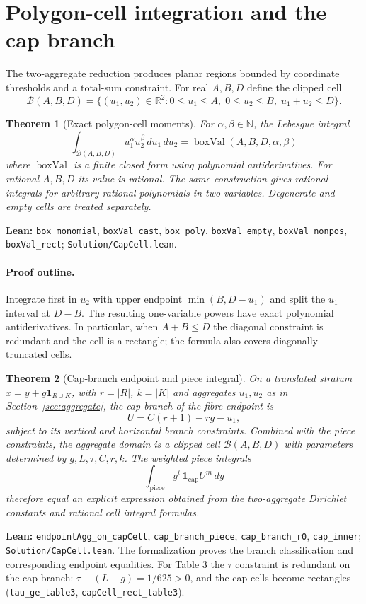 \documentclass[11pt]{article}
\newtheorem{theorem}{Theorem}[section]
\newcommand{\R}{\mathbb{R}}
\newcommand{\N}{\mathbb{N}}
\newcommand{\code}[1]{\texttt{#1}}
\begin{document}
\section{Polygon-cell integration and the cap branch}\label{sec:capcell}
The two-aggregate reduction produces planar regions bounded by coordinate
thresholds and a total-sum constraint. For real $A,B,D$ define the clipped cell
\[
 \mathcal B(A,B,D)=\{(u_1,u_2)\in\R^2:0\le u_1\le A,\;
 0\le u_2\le B,\;u_1+u_2\le D\}.
\]
\begin{theorem}[Exact polygon-cell moments]\label{thm:box}
For $\alpha,\beta\in\N$, the Lebesgue integral
\[
 \int_{\mathcal B(A,B,D)}u_1^\alpha u_2^\beta\,du_1\,du_2
 =\operatorname{boxVal}(A,B,D,\alpha,\beta)
\]
where $\operatorname{boxVal}$ is a finite closed form using polynomial
antiderivatives. For rational $A,B,D$ its value is rational. The same
construction gives rational integrals for arbitrary rational polynomials in
two variables. Degenerate and empty cells are treated separately.
\end{theorem}
\noindent\textbf{Lean:} \code{box\_monomial}, \code{boxVal\_cast},
\code{box\_poly}, \code{boxVal\_empty}, \code{boxVal\_nonpos},
\code{boxVal\_rect}; \nolinkurl{Solution/CapCell.lean}.

\paragraph{Proof outline.}
Integrate first in $u_2$ with upper endpoint
$\min(B,D-u_1)$ and split the $u_1$ interval at $D-B$. The resulting
one-variable powers have exact polynomial antiderivatives. In particular,
when $A+B\le D$ the diagonal constraint is redundant and the cell is a
rectangle; the formula also covers diagonally truncated cells.

\begin{theorem}[Cap-branch endpoint and piece integral]\label{thm:capbranch}
On a translated stratum $x=y+g\mathbf1_{R\cup K}$, with
$r=|R|$, $k=|K|$ and aggregates $u_1,u_2$ as in
Section~\ref{sec:aggregate}, the cap branch of the fibre endpoint is
\[
 U=C(r+1)-rg-u_1,
\]
subject to its vertical and horizontal branch constraints. Combined with
the piece constraints, the aggregate domain is a clipped cell
$\mathcal B(A,B,D)$ with parameters determined by $g,L,\tau,C,r,k$.
The weighted piece integrals
\[
 \int_{\mathrm{piece}} y^t\,\mathbf1_{\mathrm{cap}}
 U^m\,dy
\]
therefore equal an explicit expression obtained from the two-aggregate
Dirichlet constants and rational cell integral formulas.
\end{theorem}
\noindent\textbf{Lean:} \code{endpointAgg\_on\_capCell},
\code{cap\_branch\_piece}, \code{cap\_branch\_r0},
\code{cap\_inner}; \nolinkurl{Solution/CapCell.lean}.
The formalization proves the branch classification and corresponding
endpoint equalities. For Table 3 the $\tau$ constraint is redundant on
the cap branch: $\tau-(L-g)=1/625>0$, and the cap cells become rectangles
(\code{tau\_ge\_table3}, \code{capCell\_rect\_table3}).
\end{document}
